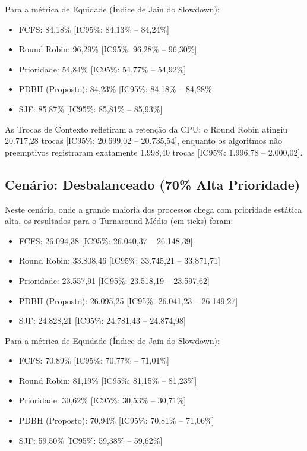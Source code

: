 \documentclass[conference]{IEEEtran}
\begin{document}
Para a métrica de Equidade (Índice de Jain do Slowdown):
\begin{itemize}
    \item FCFS: 84,18\% [IC95\%: 84,13\% -- 84,24\%]
    \item Round Robin: 96,29\% [IC95\%: 96,28\% -- 96,30\%]
    \item Prioridade: 54,84\% [IC95\%: 54,77\% -- 54,92\%]
    \item PDBH (Proposto): 84,23\% [IC95\%: 84,18\% -- 84,28\%]
    \item SJF: 85,87\% [IC95\%: 85,81\% -- 85,93\%]
\end{itemize}

As Trocas de Contexto refletiram a retenção da CPU: o Round Robin atingiu 20.717,28 trocas [IC95\%: 20.699,02 -- 20.735,54], enquanto os algoritmos não preemptivos registraram exatamente 1.998,40 trocas [IC95\%: 1.996,78 -- 2.000,02].

\subsection{Cenário: Desbalanceado (70\% Alta Prioridade)}
Neste cenário, onde a grande maioria dos processos chega com prioridade estática alta, os resultados para o Turnaround Médio (em ticks) foram:
\begin{itemize}
    \item FCFS: 26.094,38 [IC95\%: 26.040,37 -- 26.148,39]
    \item Round Robin: 33.808,46 [IC95\%: 33.745,21 -- 33.871,71]
    \item Prioridade: 23.557,91 [IC95\%: 23.518,19 -- 23.597,62]
    \item PDBH (Proposto): 26.095,25 [IC95\%: 26.041,23 -- 26.149,27]
    \item SJF: 24.828,21 [IC95\%: 24.781,43 -- 24.874,98]
\end{itemize}

Para a métrica de Equidade (Índice de Jain do Slowdown):
\begin{itemize}
    \item FCFS: 70,89\% [IC95\%: 70,77\% -- 71,01\%]
    \item Round Robin: 81,19\% [IC95\%: 81,15\% -- 81,23\%]
    \item Prioridade: 30,62\% [IC95\%: 30,53\% -- 30,71\%]
    \item PDBH (Proposto): 70,94\% [IC95\%: 70,81\% -- 71,06\%]
    \item SJF: 59,50\% [IC95\%: 59,38\% -- 59,62\%]
\end{itemize}
\end{document}
